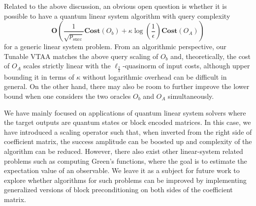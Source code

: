 \documentclass[letterpaper,onecolumn,11pt,accepted=2026-02-14]{quantumarticle}
\theoremstyle{remark}
\theoremstyle{plain}
\begin{document}
Related to the above discussion, an obvious open question is whether it is possible to have a quantum linear system algorithm with query complexity
\begin{equation}
    \mathbf{O}\left(\frac{1}{\sqrt{p_{\text{succ}}}}\mathbf{Cost}(O_b)
    +\kappa\log\left(\frac{1}{\epsilon}\right)\mathbf{Cost}\left(O_A\right)\right)
\end{equation}
for a generic linear system problem.
From an algorithmic perspective, our Tunable VTAA matches the above query scaling of $O_b$ and, theoretically, the cost of $O_A$ scales strictly linear with the $\ell_{\frac{2}{3}}$-quasinorm of input costs, although upper bounding it in terms of $\kappa$ without logarithmic overhead can be difficult in general. On the other hand, there may also be room to further improve the lower bound when one considers the two oracles $O_b$ and $O_A$ simultaneously.

We have mainly focused on applications of quantum linear system solvers where the target outputs are quantum states or block encoded matrices. In this case, we have introduced a scaling operator such that, when inverted from the right side of coefficient matrix, the success amplitude can be boosted up and complexity of the algorithm can be reduced. However, there also exist other linear-system related problems such as computing Green's functions, where the goal is to estimate the expectation value of an observable. We leave it as a subject for future work to explore whether algorithms for such problems can be improved by implementing generalized versions of block preconditioning on both sides of the coefficient matrix.
\end{document}

